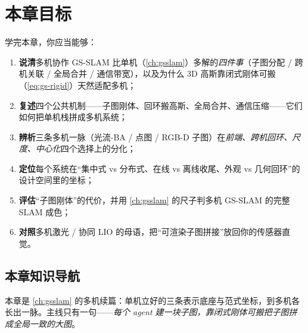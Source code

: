 \section*{本章目标}
学完本章，你应当能够：
\begin{enumerate}
  \item \textbf{说清}多机协作 GS-SLAM 比单机（\cref{ch:gsslam}）多解的\emph{四件事}（子图分配 / 跨机关联 / 全局合并 / 通信带宽），以及为什么 3D 高斯靠闭式刚体可搬（\cref{eq:gs-rigid}）天然适配多机；
  \item \textbf{复述}四个公共机制——子图刚体、回环搬高斯、全局合并、通信压缩——它们如何把单机栈拼成多机系统；
  \item \textbf{辨析}三条多机一脉（光流-BA / 点图 / RGB-D 子图）在\emph{前端、跨机回环、尺度、中心化}四个选择上的分化；
  \item \textbf{定位}每个系统在“集中式 vs 分布式、在线 vs 离线收尾、外观 vs 几何回环”的设计空间里的坐标；
  \item \textbf{评估}“子图刚体”的代价，并用 \cref{ch:gsslam} 的尺子判多机 GS-SLAM 的完整 SLAM 成色；
  \item \textbf{对照}多机激光 / 协同 LIO 的母语，把“可渲染子图拼接”放回你的传感器直觉。
\end{enumerate}

\subsection*{本章知识导航}
本章是 \cref{ch:gsslam} 的多机续篇：单机立好的三条表示底座与范式坐标，到多机各长出一脉。主线只有一句——\emph{每个 agent 建一块子图，靠闭式刚体可搬把子图拼成全局一致的大图}。

